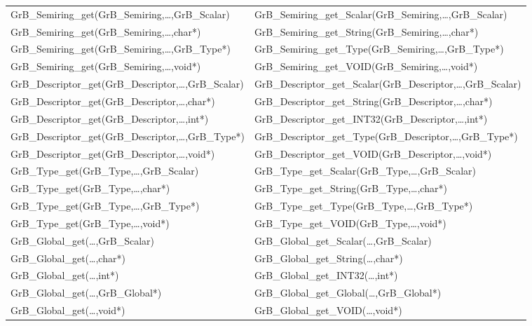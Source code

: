 \begin{table}[htb]
{\begin{tabular}{l|l}
{\sf GrB\_Semiring\_get(GrB\_Semiring,\ldots,GrB\_Scalar)}  & {\sf GrB\_Semiring\_get\_Scalar(GrB\_Semiring,\ldots,GrB\_Scalar)} \\
{\sf GrB\_Semiring\_get(GrB\_Semiring,\ldots,char*)}        & {\sf GrB\_Semiring\_get\_String(GrB\_Semiring,\ldots,char*)} \\
{\sf GrB\_Semiring\_get(GrB\_Semiring,\ldots,GrB\_Type*)}   & {\sf GrB\_Semiring\_get\_Type(GrB\_Semiring,\ldots,GrB\_Type*)} \\
{\sf GrB\_Semiring\_get(GrB\_Semiring,\ldots,void*)}        & {\sf GrB\_Semiring\_get\_VOID(GrB\_Semiring,\ldots,void*)} \\
\hline

{\sf GrB\_Descriptor\_get(GrB\_Descriptor,\ldots,GrB\_Scalar)}  & {\sf GrB\_Descriptor\_get\_Scalar(GrB\_Descriptor,\ldots,GrB\_Scalar)} \\
{\sf GrB\_Descriptor\_get(GrB\_Descriptor,\ldots,char*)}        & {\sf GrB\_Descriptor\_get\_String(GrB\_Descriptor,\ldots,char*)} \\
{\sf GrB\_Descriptor\_get(GrB\_Descriptor,\ldots,int*)}        & {\sf GrB\_Descriptor\_get\_INT32(GrB\_Descriptor,\ldots,int*)} \\
{\sf GrB\_Descriptor\_get(GrB\_Descriptor,\ldots,GrB\_Type*)}   & {\sf GrB\_Descriptor\_get\_Type(GrB\_Descriptor,\ldots,GrB\_Type*)} \\
{\sf GrB\_Descriptor\_get(GrB\_Descriptor,\ldots,void*)}        & {\sf GrB\_Descriptor\_get\_VOID(GrB\_Descriptor,\ldots,void*)} \\
\hline

{\sf GrB\_Type\_get(GrB\_Type,\ldots,GrB\_Scalar)}  & {\sf GrB\_Type\_get\_Scalar(GrB\_Type,\ldots,GrB\_Scalar)} \\
{\sf GrB\_Type\_get(GrB\_Type,\ldots,char*)}        & {\sf GrB\_Type\_get\_String(GrB\_Type,\ldots,char*)} \\
{\sf GrB\_Type\_get(GrB\_Type,\ldots,GrB\_Type*)}   & {\sf GrB\_Type\_get\_Type(GrB\_Type,\ldots,GrB\_Type*)} \\
{\sf GrB\_Type\_get(GrB\_Type,\ldots,void*)}        & {\sf GrB\_Type\_get\_VOID(GrB\_Type,\ldots,void*)} \\
\hline

{\sf GrB\_Global\_get(\ldots,GrB\_Scalar)}  & {\sf GrB\_Global\_get\_Scalar(\ldots,GrB\_Scalar)} \\
{\sf GrB\_Global\_get(\ldots,char*)}        & {\sf GrB\_Global\_get\_String(\ldots,char*)} \\
{\sf GrB\_Global\_get(\ldots,int*)}        & {\sf GrB\_Global\_get\_INT32(\ldots,int*)} \\
{\sf GrB\_Global\_get(\ldots,GrB\_Global*)}   & {\sf GrB\_Global\_get\_Global(\ldots,GrB\_Global*)} \\
{\sf GrB\_Global\_get(\ldots,void*)}        & {\sf GrB\_Global\_get\_VOID(\ldots,void*)} \\
\hline
\end{tabular}
}
\label{Tab:NonPolymorphic7}
\end{table}

